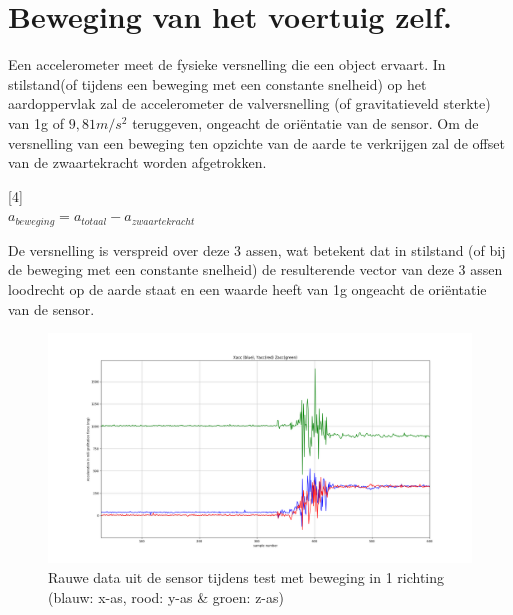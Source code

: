 \documentclass[a4paper, 11pt]{article} %
\begin{document}
\section{Beweging van het voertuig zelf.}
Een accelerometer meet de fysieke versnelling die een object ervaart. In stilstand(of tijdens een beweging met een constante snelheid) op het aardoppervlak zal de accelerometer de valversnelling (of gravitatieveld sterkte) van 1g of \begin{math}	9,81m/s^{2} \end{math} teruggeven, ongeacht de oriëntatie van de sensor. Om de versnelling van een beweging ten opzichte van de aarde te verkrijgen zal de offset van de zwaartekracht worden afgetrokken.
\begin{center}
	[4]\\
	\begin{math}
	a_{beweging} = a_{totaal} - a_{zwaartekracht}
	\end{math}
\end{center}
De versnelling is verspreid over deze 3 assen, wat betekent dat in stilstand (of bij de beweging met een constante snelheid) de resulterende vector van deze 3 assen loodrecht op de aarde staat en een waarde heeft van 1g ongeacht de oriëntatie van de sensor.
\newpage
\begin{figure}[h!]
	\centering
	\hspace*{-2cm}
	\includegraphics[width=16cm]{afbeeldingen/rawAcc.png}
	\caption{Rauwe data uit de sensor tijdens test met beweging in 1 richting (blauw: x-as, rood: y-as \& groen: z-as)}
\end{figure}
\end{document}
